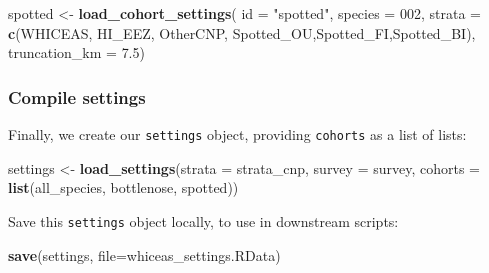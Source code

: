 \documentclass[
]{book}
\newenvironment{Shaded}{\begin{snugshade}}{\end{snugshade}}
\newcommand{\AttributeTok}[1]{\textcolor[rgb]{0.13,0.29,0.53}{#1}}
\newcommand{\FloatTok}[1]{\textcolor[rgb]{0.00,0.00,0.81}{#1}}
\newcommand{\FunctionTok}[1]{\textcolor[rgb]{0.13,0.29,0.53}{\textbf{#1}}}
\newcommand{\NormalTok}[1]{#1}
\newcommand{\OtherTok}[1]{\textcolor[rgb]{0.56,0.35,0.01}{#1}}
\newcommand{\StringTok}[1]{\textcolor[rgb]{0.31,0.60,0.02}{#1}}
\begin{document}
\begin{Shaded}
\begin{Highlighting}[]
\NormalTok{spotted }\OtherTok{\textless{}{-}} \FunctionTok{load\_cohort\_settings}\NormalTok{(}
  \AttributeTok{id =} \StringTok{"spotted"}\NormalTok{,}
  \AttributeTok{species =} \StringTok{\textquotesingle{}002\textquotesingle{}}\NormalTok{,}
  \AttributeTok{strata =} \FunctionTok{c}\NormalTok{(}\StringTok{\textquotesingle{}WHICEAS\textquotesingle{}}\NormalTok{, }\StringTok{\textquotesingle{}HI\_EEZ\textquotesingle{}}\NormalTok{, }\StringTok{\textquotesingle{}OtherCNP\textquotesingle{}}\NormalTok{,}
             \StringTok{\textquotesingle{}Spotted\_OU\textquotesingle{}}\NormalTok{,}\StringTok{\textquotesingle{}Spotted\_FI\textquotesingle{}}\NormalTok{,}\StringTok{\textquotesingle{}Spotted\_BI\textquotesingle{}}\NormalTok{),}
  \AttributeTok{truncation\_km =} \FloatTok{7.5}\NormalTok{)}
\end{Highlighting}
\end{Shaded}

\hypertarget{compile-settings}{%
\subsubsection*{Compile settings}\label{compile-settings}}

Finally, we create our \texttt{settings} object, providing \texttt{cohorts} as a list of lists:

\begin{Shaded}
\begin{Highlighting}[]
\NormalTok{settings }\OtherTok{\textless{}{-}} \FunctionTok{load\_settings}\NormalTok{(}\AttributeTok{strata =}\NormalTok{ strata\_cnp,}
                          \AttributeTok{survey =}\NormalTok{ survey,}
                          \AttributeTok{cohorts =} \FunctionTok{list}\NormalTok{(all\_species,}
\NormalTok{                                         bottlenose,}
\NormalTok{                                         spotted))}
\end{Highlighting}
\end{Shaded}

Save this \texttt{settings} object locally, to use in downstream scripts:

\begin{Shaded}
\begin{Highlighting}[]
\FunctionTok{save}\NormalTok{(settings, }\AttributeTok{file=}\StringTok{\textquotesingle{}whiceas\_settings.RData\textquotesingle{}}\NormalTok{)}
\end{Highlighting}
\end{Shaded}
\end{document}
